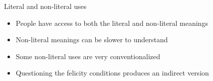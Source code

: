 \documentclass{beamer}
\begin{document}
\begin{frame}{Literal and non-literal uses}

\begin{exe}
  \ex
  \begin{xlist}
    \ex {}
    \ex {}
  \end{xlist}
  \ex 
  \begin{xlist}
    \ex {}
    \ex {}
  \end{xlist}
  \ex
  \begin{xlist}
    \ex {}
    \ex {}
  \end{xlist}
\end{exe}
\begin{itemize}
\item People have access to both the literal and non-literal meanings
\item Non-literal meanings can be slower to understand
\item Some non-literal uses are very conventionalized 
  \\  \into {}
\item Questioning the felicity conditions produces an indirect version
\end{itemize}


\end{frame}
\end{document}

